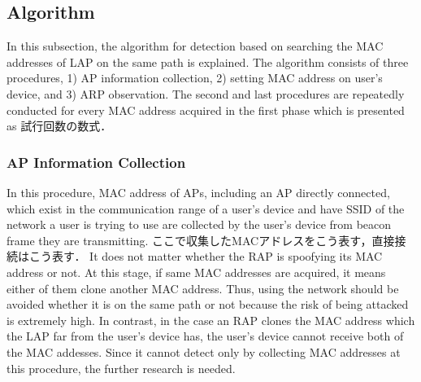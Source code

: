 \documentclass[conference]{IEEEtran}
\begin{document}


\subsection{Algorithm}
In this subsection, the algorithm for detection based on searching the MAC addresses of LAP on the same path is explained.
The algorithm consists of three procedures, 1) AP information collection, 2) setting MAC address on user's device, and 3) ARP observation.
The second and last procedures are repeatedly conducted for every MAC address acquired in the first phase which is presented as 試行回数の数式．
\subsubsection{AP Information Collection}
In this procedure, MAC address of APs, including an AP directly connected, which exist in the communication range of a user's device and have SSID of the network a user is trying to use are collected by the user's device from beacon frame they are transmitting.
ここで収集したMACアドレスをこう表す，直接接続はこう表す．
It does not matter whether the RAP is spoofying its MAC address or not.
At this stage, if same MAC addresses are acquired, it means either of them clone another MAC address.
Thus, using the network should be avoided whether it is on the same path or not because the risk of being attacked is extremely high. 
In contrast, in the case an RAP clones the MAC address which the LAP far from the user's device has, the user's device cannot receive both of the MAC addesses.
Since it cannot detect only by collecting MAC addresses at this procedure, the further research is needed.
\end{document}
